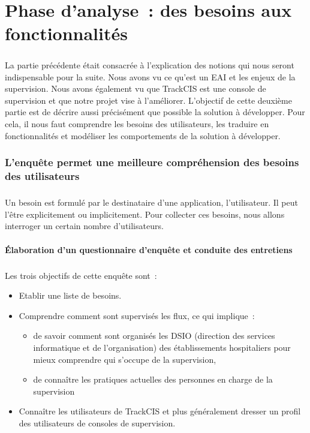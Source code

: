 \chapter{Phase d'analyse~: des besoins aux fonctionnalités}
	\paragraph{}
	La partie précédente était consacrée à l'explication des notions qui nous
	seront indispensable pour la suite. Nous avons vu
	ce qu'est un EAI et les enjeux de la supervision. Nous avons également vu que
	TrackCIS est une console de supervision et que notre projet vise à l'améliorer.
	L'objectif de cette deuxième partie est de décrire aussi précisément que
	possible la solution à développer. Pour cela, il nous faut comprendre les
	besoins des utilisateurs, les traduire en
	fonctionnalités et modéliser les comportements de la solution à développer.
	
	\subsection{L'enquête permet une meilleure compréhension des besoins des utilisateurs}
		\paragraph{}
		Un besoin est formulé par le destinataire d'une application, l'utilisateur. Il
		peut l'être explicitement ou implicitement. Pour collecter ces besoins, nous
		allons interroger un certain nombre d'utilisateurs.
		
		\subsubsection{Élaboration d'un questionnaire d'enquête et conduite des entretiens}
			\paragraph{}%
			Les trois objectifs de cette enquête sont~:
			\begin{itemize}
			  \item Etablir une liste de besoins.
			  \item Comprendre comment sont supervisés les flux, ce qui implique~:
			  \begin{itemize}
			    \item de savoir comment sont
			  	organisés les DSIO (direction des services informatique et de
			  	l’organisation) des établissements hospitaliers pour mieux comprendre qui
			  	s'occupe de la supervision,
			  	\item de connaître les pratiques actuelles des personnes en charge de la
			  	supervision
			  	\end{itemize}
			  \item Connaître les utilisateurs de TrackCIS et plus généralement dresser
			  un profil des utilisateurs de consoles de supervision.
			\end{itemize}
			
